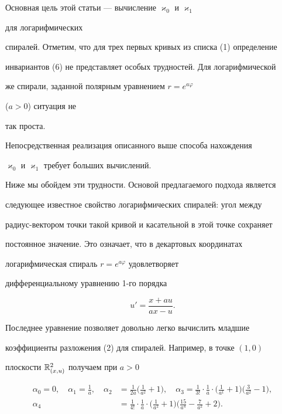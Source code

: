  


Основная цель этой статьи --- вычисление $\varkappa_0$ и $\varkappa_1$ 


для логарифмических 


спиралей. Отметим, что для трех первых кривых из списка (1) определение 


инвариантов (6) не представляет особых трудностей. Для логарифмической 


же спирали, заданной полярным уравнением $r=e^{a\varphi}$ 


($a>0$) ситуация не 


так проста. 


Непосредственная реализация описанного выше способа нахождения 


$\varkappa_0$ и $\varkappa_1$ требует больших вычислений. 


 


Ниже мы обойдем эти трудности. Основой предлагаемого подхода является 


следующее известное свойство логарифмических спиралей: угол между 


радиус-вектором точки такой кривой и касательной в этой точке сохраняет 


постоянное значение. Это означает, что в декартовых координатах 


логарифмическая спираль $r=e^{a\varphi}$ удовлетворяет


дифференциальному уравнению 1-го порядка 


\begin{equation} 


u'=\frac{x+au}{ax-u}. 


\end{equation} 


 


Последнее уравнение позволяет довольно легко вычислить младшие 


коэффициенты разложения (2) для спиралей. Например, в точке $(1,0)$ 


плоскости $\Bbb R^2_{(x,u)}$ получаем при $a>0$ 


\begin{equation} 


\begin{split} 


\alpha_0=0,\quad \alpha_1=\frac{1}{a},\quad 


\alpha_2&=\frac{1}{2a}\biggl(\frac{1}{a^2}+1\biggr),\quad 


\alpha_3=\frac{1}{3!}\cdot\frac{1}{a}\cdot\biggl(\frac{1}{a^1}+1 


\biggr)\biggl(\frac{3}{a^2}-1\biggr),\\ 


\alpha_4&=\frac{1}{4!}\cdot\frac{1}{a}\cdot\biggl(\frac{1}{a^2}+1 


\biggr)\biggl(\frac{15}{a^4}-\frac{7}{a^2}+2\biggr). 


\end{split} 


\end{equation} 


